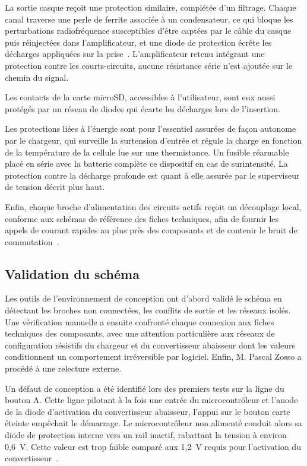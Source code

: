 La sortie casque reçoit une protection similaire, complétée d'un filtrage. Chaque canal traverse une perle de ferrite associée à un condensateur, ce qui bloque les perturbations radiofréquence susceptibles d'être captées par le câble du casque puis réinjectées dans l'amplificateur, et une diode de protection écrête les décharges appliquées sur la prise~\cite{microchip_technology_inc_an1767_2014}. L'amplificateur retenu intégrant une protection contre les courts-circuits, aucune résistance série n'est ajoutée sur le chemin du signal.

Les contacts de la carte microSD, accessibles à l'utilisateur, sont eux aussi protégés par un réseau de diodes qui écarte les décharges lors de l'insertion.

Les protections liées à l'énergie sont pour l'essentiel assurées de façon autonome par le chargeur, qui surveille la surtension d'entrée et régule la charge en fonction de la température de la cellule lue sur une thermistance. Un fusible réarmable placé en série avec la batterie complète ce dispositif en cas de surintensité. La protection contre la décharge profonde est quant à elle assurée par le superviseur de tension décrit plus haut.

Enfin, chaque broche d'alimentation des circuits actifs reçoit un découplage local, conforme aux schémas de référence des fiches techniques, afin de fournir les appels de courant rapides au plus près des composants et de contenir le bruit de commutation~\cite{prof_bogatin_rules_2013}.


\subsection{Validation du schéma}

Les outils de l'environnement de conception ont d'abord validé le schéma en détectant les broches non connectées, les conflits de sortie et les réseaux isolés. Une vérification manuelle a ensuite confronté chaque connexion aux fiches techniques des composants, avec une attention particulière aux réseaux de configuration résistifs du chargeur et du convertisseur abaisseur dont les valeurs conditionnent un comportement irréversible par logiciel. Enfin, M. Pascal Zosso a procédé à une relecture externe.

Un défaut de conception a été identifié lors des premiers tests sur la ligne du bouton A. Cette ligne pilotant à la fois une entrée du microcontrôleur et l'anode de la diode d'activation du convertisseur abaisseur, l'appui sur le bouton carte éteinte empêchait le démarrage. Le microcontrôleur non alimenté conduit alors sa diode de protection interne vers un rail inactif, rabattant la tension à environ 0,6~V. Cette valeur est trop faible comparé aux 1,2~V requis pour l'activation du convertisseur~\cite{TI_TPS62A01}.

